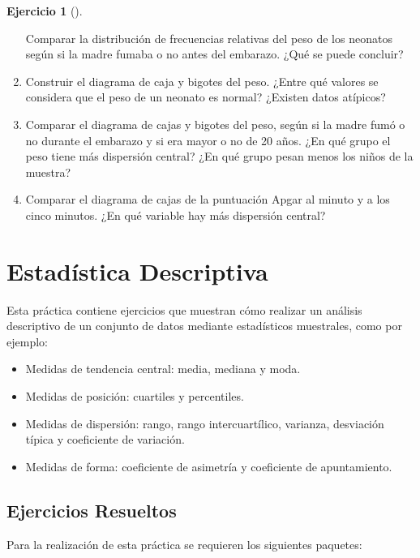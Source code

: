 \documentclass[
  spanish,
  a4paper,
]{scrreport}
\providecommand{\tightlist}{%
  \setlength{\itemsep}{0pt}\setlength{\parskip}{0pt}}
\theoremstyle{definition}
\newtheorem{exercise}{Ejercicio}[chapter]
\theoremstyle{remark}
\begin{document}
\begin{exercise}[]
\begin{enumerate}
  Comparar la distribución de frecuencias relativas del peso de los
  neonatos según si la madre fumaba o no antes del embarazo. ¿Qué se
  puede concluir?
\item
  Construir el diagrama de caja y bigotes del peso. ¿Entre qué valores
  se considera que el peso de un neonato es normal? ¿Existen datos
  atípicos?
\item
  Comparar el diagrama de cajas y bigotes del peso, según si la madre
  fumó o no durante el embarazo y si era mayor o no de 20 años. ¿En qué
  grupo el peso tiene más dispersión central? ¿En qué grupo pesan menos
  los niños de la muestra?
\item
  Comparar el diagrama de cajas de la puntuación Apgar al minuto y a los
  cinco minutos. ¿En qué variable hay más dispersión central?
\end{enumerate}

\end{exercise}


\chapter{Estadística Descriptiva}\label{estaduxedstica-descriptiva}

Esta práctica contiene ejercicios que muestran cómo realizar un análisis
descriptivo de un conjunto de datos mediante estadísticos muestrales,
como por ejemplo:

\begin{itemize}
\tightlist
\item
  Medidas de tendencia central: media, mediana y moda.
\item
  Medidas de posición: cuartiles y percentiles.
\item
  Medidas de dispersión: rango, rango intercuartílico, varianza,
  desviación típica y coeficiente de variación.
\item
  Medidas de forma: coeficiente de asimetría y coeficiente de
  apuntamiento.
\end{itemize}

\section{Ejercicios Resueltos}\label{ejercicios-resueltos-3}

Para la realización de esta práctica se requieren los siguientes
paquetes:
\end{document}
